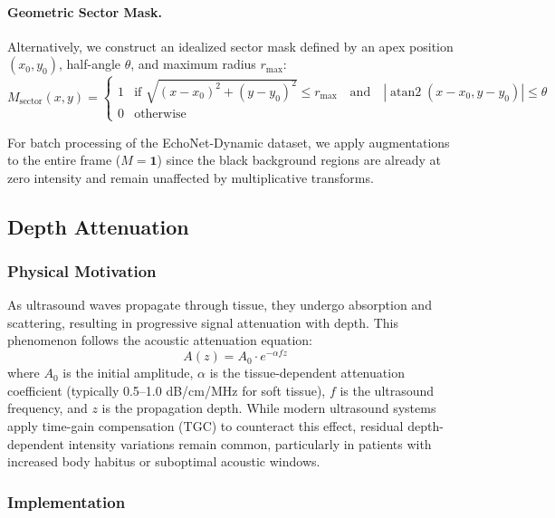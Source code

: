 \documentclass{article}
\theoremstyle{plain}
\theoremstyle{definition}
\theoremstyle{remark}
\begin{document}
\paragraph{Geometric Sector Mask.} Alternatively, we construct an idealized sector mask defined by an apex position $(x_0, y_0)$, half-angle $\theta$, and maximum radius $r_{\max}$:
\begin{equation}
    M_{\text{sector}}(x, y) = \begin{cases}
        1 & \text{if } \sqrt{(x-x_0)^2 + (y-y_0)^2} \leq r_{\max} \quad \text{and} \quad \left|\operatorname{atan2}(x-x_0, y-y_0)\right| \leq \theta \\
        0 & \text{otherwise}
    \end{cases}
\end{equation}

For batch processing of the EchoNet-Dynamic dataset, we apply augmentations to the entire frame ($M = \mathbf{1}$) since the black background regions are already at zero intensity and remain unaffected by multiplicative transforms.

\subsection{Depth Attenuation}
\label{appendix:depth_attenuation}

\subsubsection{Physical Motivation}

As ultrasound waves propagate through tissue, they undergo absorption and scattering, resulting in progressive signal attenuation with depth. This phenomenon follows the acoustic attenuation equation:
\begin{equation}
    A(z) = A_0 \cdot e^{-\alpha f z}
\end{equation}
where $A_0$ is the initial amplitude, $\alpha$ is the tissue-dependent attenuation coefficient (typically 0.5--1.0 dB/cm/MHz for soft tissue), $f$ is the ultrasound frequency, and $z$ is the propagation depth. While modern ultrasound systems apply time-gain compensation (TGC) to counteract this effect, residual depth-dependent intensity variations remain common, particularly in patients with increased body habitus or suboptimal acoustic windows.

\subsubsection{Implementation}
\end{document}
